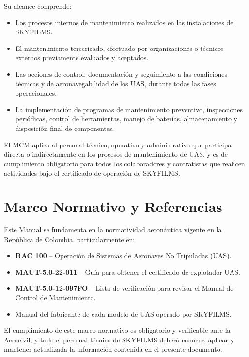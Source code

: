 Su alcance comprende:

\begin{itemize}
    \item Los procesos internos de mantenimiento realizados en las instalaciones de SKYFILMS.

    \item El mantenimiento tercerizado, efectuado por organizaciones o técnicos externos previamente evaluados y aceptados.

    \item Las acciones de control, documentación y seguimiento a las condiciones técnicas y de aeronavegabilidad de los UAS, durante todas las fases operacionales.

    \item La implementación de programas de mantenimiento preventivo, inspecciones periódicas, control de herramientas, manejo de baterías, almacenamiento y disposición final de componentes.
\end{itemize}

El MCM aplica al personal técnico, operativo y administrativo que participa directa o indirectamente en los procesos de mantenimiento de UAS, y es de cumplimiento obligatorio para todos los colaboradores y contratistas que realicen actividades bajo el certificado de operación de SKYFILMS.

\section{Marco Normativo y Referencias}
Este Manual se fundamenta en la normatividad aeronáutica vigente en la República de Colombia, particularmente en:

\begin{itemize}
    \item \textbf{RAC 100} – Operación de Sistemas de Aeronaves No Tripuladas (UAS).

    \item \textbf{MAUT-5.0-22-011} – Guía para obtener el certificado de explotador UAS.

    \item \textbf{MAUT-5.0-12-097FO} – Lista de verificación para revisar el Manual de Control de Mantenimiento.

    \item Manual del fabricante de cada modelo de UAS operado por SKYFILMS.
\end{itemize}

El cumplimiento de este marco normativo es obligatorio y verificable ante la Aerocivil, y todo el personal técnico de SKYFILMS deberá conocer, aplicar y mantener actualizada la información contenida en el presente documento.

